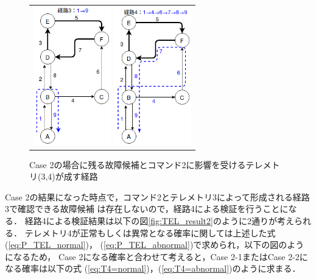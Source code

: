\documentclass[11pt]{jsreport}
\begin{document}
\begin{figure}[H]
   \centering
      \begin{tabular}{c}
         \begin{minipage}{0.50\hsize}
         \centering
         \includegraphics[height=6cm]{figure/second_route_T3.png}
         \end{minipage}
         \begin{minipage}{0.50\hsize}
         \centering
         \includegraphics[height=6cm]{figure/second_route_T4.png}
         \end{minipage}
      \end{tabular}
      \caption{Case 2の場合に残る故障候補とコマンド2に影響を受けるテレメトリ(3,4)が成す経路}
      \label{fig:sucond_route}  
\end{figure}

Case 2の結果になった時点で，コマンド2とテレメトリ3によって形成される経路3で確認できる故障候補
は存在しないので，経路4による検証を行うことになる．
経路4による検証結果は以下の図\ref{fig:TEL_result2}のように2通りが考えられる．
テレメトリ4が正常もしくは異常となる確率に関しては上述した式(\ref{eq:P_TEL_normal})，
(\ref{eq:P_TEL_abnormal})で求められ，以下の図のようになるため，
Case 2になる確率と合わせて考えると，Case 2-1またはCase 2-2になる確率は以下の式
(\ref{eq:T4=normal})，(\ref{eq:T4=abnormal})のように求まる．
\end{document}
